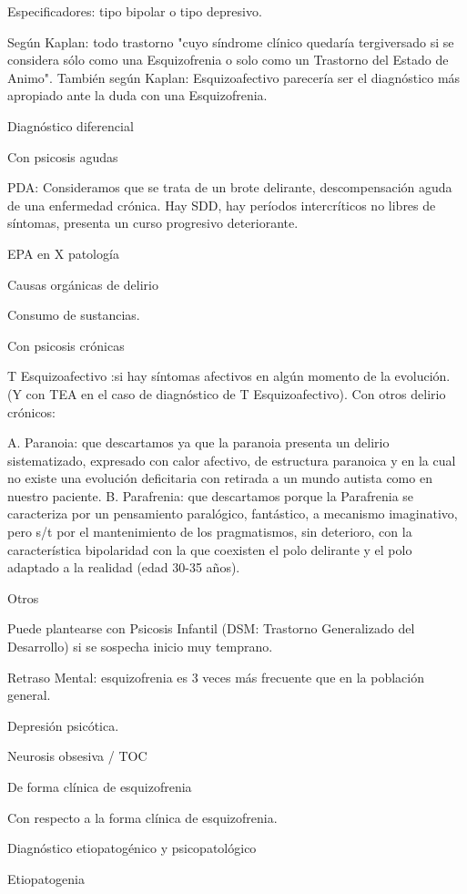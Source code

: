 Especificadores: tipo bipolar o tipo depresivo.

Según Kaplan: todo trastorno "cuyo síndrome clínico quedaría tergiversado si se considera sólo como una Esquizofrenia o solo como un Trastorno del Estado de Animo". También según Kaplan: Esquizoafectivo parecería ser el diagnóstico más apropiado ante la duda con una Esquizofrenia.

Diagnóstico diferencial

Con psicosis agudas

PDA: Consideramos que se trata de un brote delirante, descompensación aguda de una enfermedad crónica. Hay SDD, hay períodos intercríticos no libres de síntomas, presenta un curso progresivo deteriorante.

EPA en X patología

Causas orgánicas de delirio

Consumo de sustancias.

Con psicosis crónicas

T Esquizoafectivo :si hay síntomas afectivos en algún momento de la evolución. (Y con TEA en el caso de diagnóstico de T Esquizoafectivo). Con otros delirio crónicos:

A. Paranoia: que descartamos ya que la paranoia presenta un delirio sistematizado, expresado con calor afectivo, de estructura paranoica y en la cual no existe una evolución deficitaria con retirada a un mundo autista como en nuestro paciente.
B. Parafrenia: que descartamos porque la Parafrenia se caracteriza por un pensamiento paralógico, fantástico, a mecanismo imaginativo, pero s/t por el mantenimiento de los pragmatismos, sin deterioro, con la característica bipolaridad con la que coexisten el polo delirante y el polo adaptado a la realidad (edad 30-35 años).

Otros

Puede plantearse con Psicosis Infantil (DSM: Trastorno Generalizado del Desarrollo) si se sospecha inicio muy temprano.

Retraso Mental: esquizofrenia es 3 veces más frecuente que en la población general.

Depresión psicótica.

Neurosis obsesiva / TOC

De forma clínica de esquizofrenia

Con respecto a la forma clínica de esquizofrenia.

Diagnóstico etiopatogénico y psicopatológico

Etiopatogenia

